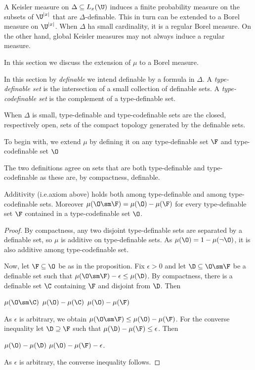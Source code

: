 \documentclass[creche.tex]{subfiles}
\begin{document}
A Keisler measure on $\Delta\subseteq L_x(\U)$ induces a finite probability measure on the subsets of $\U^{|x|}$ that are $\Delta$-definable.
This in turn can be extended to a Borel measure on $\U^{|x|}$.
When $\Delta$ ha small cardinality, it is a regular Borel measure.
On the other hand, global Keisler measures may not always induce a regular measure.

In this section we discuss the extension of $\mu$ to a Borel measure.  

In this section by \emph{definable\/} we intend definable by a formula in $\Delta$.
A \emph{type-definable set\/} is the intersection of a small collection of definable sets.
 A \emph{type-codefinable set\/} is the complement of a type-definable set.

When $\Delta$ is small, type-definable and type-codefinable sets are the closed, respectively open, sets of the compact topology generated by the definable sets.

To begin with, we extend $\mu$ by defining it on any type-definable set $\F$ and type-codefinable set $\O$ 



The two definitions agree on sets that are both type-definable and type-codefinable as these are, by compactness, definable.

\begin{proposition}\label{prop_measure_on_open_closed}
Additivity (i.e.\@ axiom  above) holds both among type-definable and among type-codefinable sets.
Moreover $\mu(\O\sm\F)=\mu(\O)-\mu(\F)$ for every type-definable set $\F$ contained in a type-codefinable set $\O$.
\end{proposition}
\begin{proof}
By compactness, any two disjoint type-definable  sets are separated by a definable set, so $\mu$ is additive on type-definable  sets.
As $\mu(\O)=1-\mu(\neg\O)$, it is also additive among type-codefinable set.

Now, let $\F\subseteq\O$ be as in the proposition.
Fix $\epsilon>0$ and let $\D\subseteq\O\sm\F$ be a definable set such that $\mu(\O\sm\F)-\epsilon\le\mu(\D)$.
By compactness, there is a definable set $\C$ containing $\F$ and disjoint from $\D$.
Then

\ceq{\hfill\mu(\O\sm\F)-\epsilon}{\le}{\mu(\D)}
\medrel{\le}
$\mu(\O\sm\C)$
\medrel{=}
$\mu(\O)-\mu(\C)$
\medrel{\le}
$\mu(\O)-\mu(\F)$ 

As $\epsilon$ is arbitrary, we obtain $\mu(\O\sm\F)\le\mu(\O)-\mu(\F)$.
For the converse inequality let $\D\supseteq\F$ such that  $\mu(\D)-\mu(\F)\le\epsilon$.
Then

\ceq{\hfill\mu(\O\sm\F)}{\ge}{\mu(\O\sm\D)}
\medrel{=}
$\mu(\O)-\mu(\D)$
\medrel{\ge}
$\mu(\O)-\mu(\F)-\epsilon$.

As $\epsilon$ is arbitrary, the converse inequality follows.\end{proof}
\end{document}
